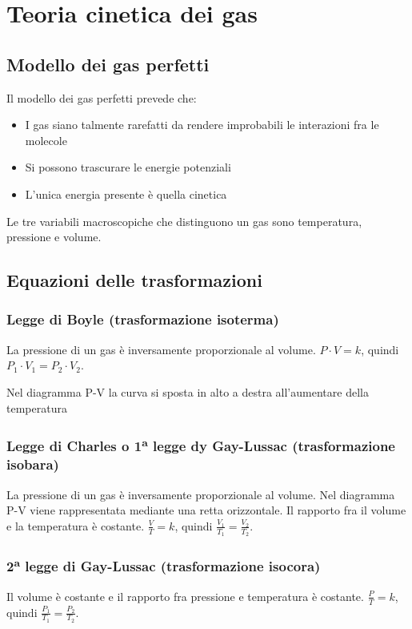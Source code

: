 \section{Teoria cinetica dei gas}
\subsection{Modello dei gas perfetti}
    \par Il modello dei gas perfetti prevede che:
    \begin{itemize}
        \item I gas siano talmente rarefatti da rendere improbabili le interazioni fra le molecole
        \item Si possono trascurare le energie potenziali
        \item L'unica energia presente è quella cinetica
    \end{itemize}
    \par Le tre variabili macroscopiche che distinguono un gas sono temperatura, pressione e volume.
\subsection{Equazioni delle trasformazioni}
    \subsubsection{Legge di Boyle (trasformazione isoterma)}
        \par La pressione di un gas è inversamente proporzionale al volume. $P \cdot V=k$, quindi $P_1 \cdot V_1=P_2 \cdot V_2$.
        \par Nel diagramma P-V la curva si sposta in alto a destra all'aumentare della temperatura
    \subsubsection{Legge di Charles o 1\textsuperscript{a} legge dy Gay-Lussac (trasformazione isobara)}
        \par La pressione di un gas è inversamente proporzionale al volume. Nel diagramma P-V viene rappresentata mediante una retta orizzontale. Il rapporto fra il volume e la temperatura è costante. $\frac{V}{T}=k$, quindi $\frac{V_1}{T_1}=\frac{V_2}{T_2}$.
    \subsubsection{2\textsuperscript{a} legge di Gay-Lussac (trasformazione isocora)}
        \par Il volume è costante e il rapporto fra pressione e temperatura è costante. $\frac{P}{T}=k$, quindi $\frac{P_1}{T_1}=\frac{P_2}{T_2}$.
